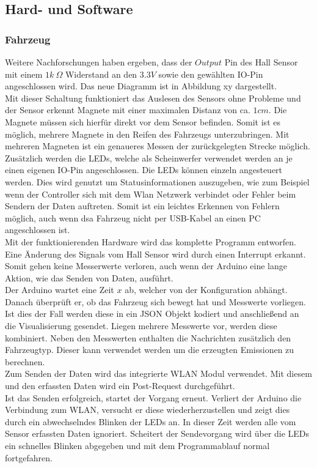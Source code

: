 \documentclass[.../Dokumentation.tex]{subfiles}
\begin{document}
    \subsection{Hard- und Software}\label{sec-ita2-hardware}
    \subsubsection*{Fahrzeug}
    Weitere Nachforschungen haben ergeben, dass der $Output$ Pin des Hall Sensor mit einem $1k\ \Omega$  Widerstand an den $3.3V$ sowie den gewählten IO-Pin angeschlossen wird. Das neue Diagramm ist in Abbildung xy dargestellt. \\
    Mit dieser Schaltung funktioniert das Auslesen des Sensors ohne Probleme und der Sensor erkennt Magnete mit einer maximalen Distanz von ca. $1 cm$. Die Magnete müssen sich hierfür direkt vor dem Sensor befinden. Somit ist es möglich, mehrere Magnete in den Reifen des Fahrzeugs unterzubringen. Mit mehreren Magneten ist ein genaueres Messen der zurückgelegten Strecke möglich. Zusätzlich werden die LEDs, welche als Scheinwerfer verwendet werden an je einen eigenen IO-Pin angeschlossen. Die LEDs können einzeln angesteuert werden. Dies wird genutzt um Statusinformationen auszugeben, wie zum Beispiel wenn der Controller sich mit dem Wlan Netzwerk verbindet oder Fehler beim Sendern der Daten auftreten. Somit ist ein leichtes Erkennen von Fehlern möglich, auch wenn dsa Fahrzeug nicht per USB-Kabel an einen PC angeschlossen ist.\\
    Mit der funktionierenden Hardware wird das komplette Programm entworfen. Eine Änderung des Signals vom Hall Sensor wird durch einen Interrupt erkannt. Somit gehen keine Messerwerte verloren, auch wenn der Arduino eine lange Aktion, wie das Senden von Daten, ausführt.\\
    Der Arduino wartet eine Zeit $x$ ab, welcher von der Konfiguration abhängt. Danach überprüft er, ob das Fahrzeug sich bewegt hat und Messwerte vorliegen. Ist dies der Fall werden diese in ein JSON Objekt kodiert und anschließend an die Visualisierung gesendet. Liegen mehrere Messwerte vor, werden diese kombiniert. Neben den Messwerten enthalten die Nachrichten zusätzlich den Fahrzeugtyp. Dieser kann verwendet werden um die erzeugten Emissionen zu berechnen.\\
    Zum Senden der Daten wird das integrierte WLAN Modul verwendet. Mit diesem und den erfassten Daten wird ein Post-Request durchgeführt.\\
   	Ist das Senden erfolgreich, startet der Vorgang erneut. Verliert der Arduino die Verbindung zum WLAN, versucht er diese wiederherzustellen und zeigt dies durch ein abwechselndes Blinken der LEDs an. In dieser Zeit werden alle vom Sensor erfassten Daten ignoriert. Scheitert der Sendevorgang wird über die LEDs ein schnelles  Blinken abgegeben und mit dem Programmablauf normal fortgefahren. 
\end{document}
